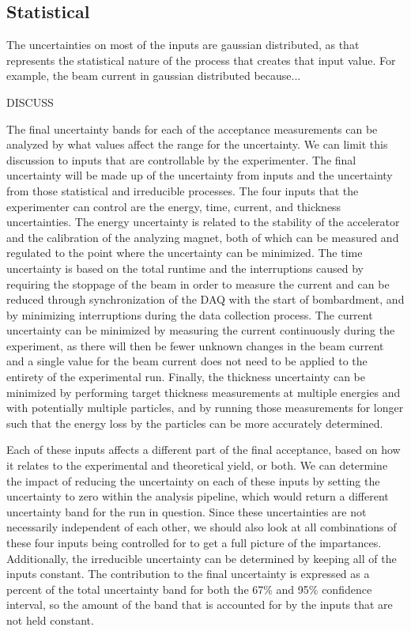 \subsection{Statistical}

The uncertainties on most of the inputs are gaussian distributed, as
that represents the statistical nature of the process that creates that
input value. For example, the beam current in gaussian distributed
because...

DISCUSS

The final uncertainty bands for each of the acceptance measurements can
be analyzed by what values affect the range for the uncertainty. We can
limit this discussion to inputs that are controllable by the
experimenter. The final uncertainty will be made up of the uncertainty
from inputs and the uncertainty from those statistical and irreducible
processes. The four inputs that the experimenter can control are the
energy, time, current, and thickness uncertainties. The energy
uncertainty is related to the stability of the accelerator and the
calibration of the analyzing magnet, both of which can be measured and
regulated to the point where the uncertainty can be minimized. The time
uncertainty is based on the total runtime and the interruptions caused
by requiring the stoppage of the beam in order to measure the current
and can be reduced through synchronization of the DAQ with the start of
bombardment, and by minimizing interruptions during the data collection
process. The current uncertainty can be minimized by measuring the
current continuously during the experiment, as there will then be fewer
unknown changes in the beam current and a single value for the beam
current does not need to be applied to the entirety of the experimental
run. Finally, the thickness uncertainty can be minimized by performing
target thickness measurements at multiple energies and with potentially
multiple particles, and by running those measurements for longer such
that the energy loss by the particles can be more accurately determined.

Each of these inputs affects a different part of the final acceptance,
based on how it relates to the experimental and theoretical yield, or
both. We can determine the impact of reducing the uncertainty on each of
these inputs by setting the uncertainty to zero within the analysis
pipeline, which would return a different uncertainty band for the run in
question. Since these uncertainties are not necessarily independent of
each other, we should also look at all combinations of these four inputs
being controlled for to get a full picture of the impartances.
Additionally, the irreducible uncertainty can be determined by keeping
all of the inputs constant. The contribution to the final uncertainty is
expressed as a percent of the total uncertainty band for both the 67\%
and 95\% confidence interval, so the amount of the band that is
accounted for by the inputs that are not held constant.

